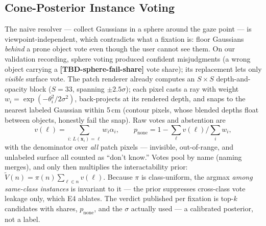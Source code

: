 \documentclass[letterpaper, 10 pt, conference]{ieeeconf}  %
\newcommand{\TBD}[1]{\textbf{\color{red}[TBD-#1]}}
\begin{document}
\subsection{Cone-Posterior Instance Voting}
The naive resolver --- collect Gaussians in a sphere around the gaze
point --- is viewpoint-independent, which contradicts what a fixation
is: floor Gaussians \emph{behind} a prone object vote even though the
user cannot see them. On our validation recording, sphere voting
produced confident misjudgments (a wrong object carrying a
\TBD{sphere-fail-share} vote share); its replacement lets only
\emph{visible} surface vote. The patch renderer already computes an
$S\times S$ depth-and-opacity block ($S{=}33$, spanning $\pm2.5\sigma$);
each pixel casts a ray with weight
$w_i=\exp(-\theta_i^2/2\sigma^2)$, back-projects at its rendered
depth, and snaps to the nearest labeled Gaussian within 5\,cm
(contour pixels, whose blended depths float between objects, honestly
fail the snap). Raw votes and abstention are
\begin{equation}
v(\ell) = \textstyle\sum_{i:\,L(\mathbf{x}_i)=\ell} w_i \alpha_i,
\qquad
p_{\mathrm{none}} = 1 - \textstyle\sum_\ell v(\ell) \big/
\textstyle\sum_i w_i ,
\end{equation}
with the denominator over \emph{all} patch pixels --- invisible,
out-of-range, and unlabeled surface all counted as ``don't know.''
Votes pool by name (naming merges), and only then multiplies the
interactability prior: $\tilde V(n) = \pi(n)\sum_{\ell\in n}v(\ell)$.
Because $\pi$ is class-uniform, the argmax \emph{among same-class
instances} is invariant to it --- the prior suppresses cross-class
vote leakage only, which E4 ablates. The verdict published per
fixation is top-$k$ candidates with shares, $p_{\mathrm{none}}$, and
the $\sigma$ actually used --- a calibrated posterior, not a label.
\end{document}
